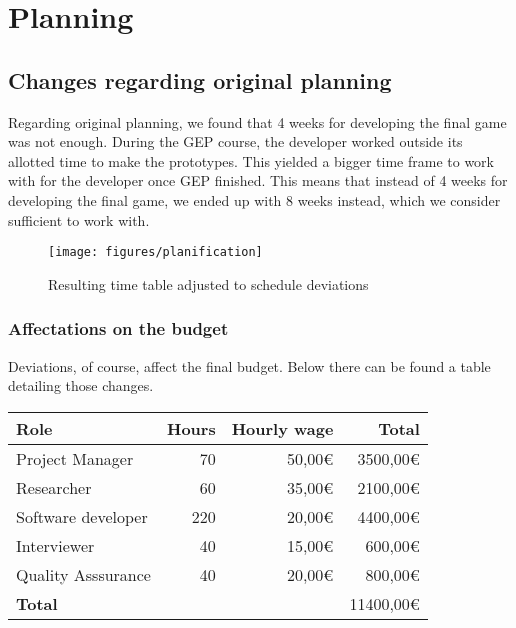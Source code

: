 \chapter{Planning}

\section{Changes regarding original planning}

Regarding original planning, we found that 4 weeks for developing the final game was not enough. During the GEP course, the developer worked outside its allotted time to make the prototypes. This yielded a bigger time frame to work with for the developer once GEP finished. This means that instead of
4 weeks for developing the final game, we ended up with 8 weeks instead, which we consider sufficient to work with.


\begin{figure}[h]
\caption{Resulting time table adjusted to schedule deviations}
\centering
\texttt{[image: figures/planification]}
\label{fig:planning}
\end{figure}

\subsection{Affectations on the budget}

Deviations, of course, affect the final budget. Below there can be found a table detailing those changes.

\begin{center}
    \begin{tabular}{ | l | r | r | r | }
        \hline
        \textbf{Role} & \textbf{Hours} & \textbf{Hourly wage} & \textbf{Total} \\ 
        \hline
        \hline
        Project Manager & 70 & 50,00€ & 3500,00€ \\  
        Researcher & 60 & 35,00€ & 2100,00€ \\
        Software developer & 220 & 20,00€ & 4400,00€ \\
        Interviewer & 40 & 15,00€ & 600,00€ \\
        Quality Asssurance & 40 & 20,00€ & 800,00€ \\
        \hline
        \textbf{Total} &  &  & 11400,00€ \\      
        \hline
    \end{tabular}
\end{center}


